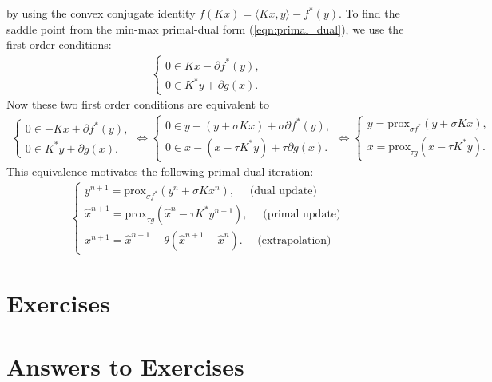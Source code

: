 \documentclass[11pt]{book}
\begin{document}
by using the convex conjugate identity $f(Kx) = \langle Kx, y  \rangle - f^*(y)$. To find the saddle point from the min-max primal-dual form (\ref{eqn:primal_dual}), we use the first order conditions:
\begin{align}
  \begin{cases}
    0 \in Kx - \partial f^*(y),  \\
    0 \in K^* y + \partial g(x). 
  \end{cases}
\end{align}
Now these two first order conditions are equivalent to
\begin{align}
  \begin{cases}
    0 \in - Kx + \partial f^*(y),  \\
    0 \in K^* y + \partial g(x). 
  \end{cases}
  \Leftrightarrow
  \begin{cases}
    0 \in y - (y + \sigma Kx) + \sigma \partial f^*(y),  \\
    0 \in x - (x - \tau K^* y)  + \tau \partial g(x). 
  \end{cases}
  \Leftrightarrow
  \begin{cases}
    y = \text{prox}_{\sigma f^*} (y + \sigma Kx),  \\
    x = \text{prox}_{\tau g}(x - \tau K^* y).
  \end{cases}
\end{align}
This equivalence motivates the following primal-dual iteration:
\begin{align}
  \begin{cases}
    y^{n+1} = \text{prox}_{\sigma f^*} (y^n + \sigma K x^n), \quad \text{\ (dual\ update)} \\
    \hat{x}^{n+1} = \text{prox}_{\tau g}(\hat{x}^n - \tau K^* y^{n+1}), \quad \text{\ (primal\ update)}\\
    x^{n+1} = \hat{x}^{n+1} + \theta (\hat{x}^{n+1} - \hat{x}^n).\quad \text{\ (extrapolation)}
  \end{cases}
\end{align}










\chapter{Exercises}





\chapter{Answers to Exercises}
















\end{document}
